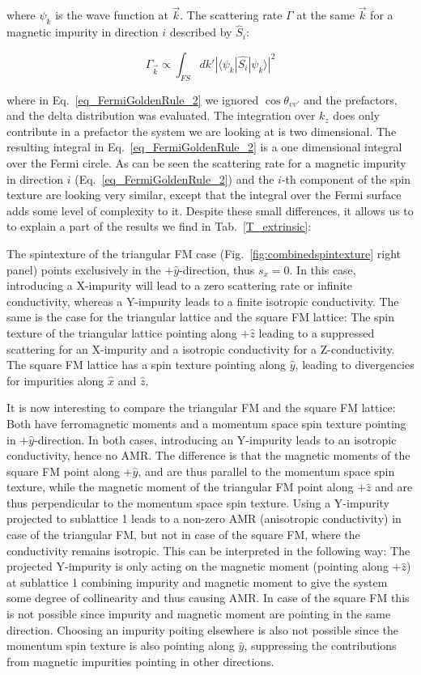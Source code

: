 \documentclass[prb,showpacs,amsmath,amssymb,superscriptaddress,twocolumn,floatfix]{revtex4-1}
\begin{document}
where $\psi_k$ is the wave function at $\vec{k}$. The scattering rate $\Gamma$ at the same $\vec{k}$ for a magnetic impurity in direction $i$ described by $\hat{S}_i$:

\begin{equation}	
{\Gamma_{\vec{k}}} \propto \int_{FS} dk' |\langle \psi_k |\hat{S_i}|\psi_k \rangle|^2
\label{eq_FermiGoldenRule_2}
\end{equation}

where in Eq.~\ref{eq_FermiGoldenRule_2} we ignored $\cos \theta_{vv'}$ and the prefactors, and the delta distribution was evaluated. The integration over $k_z$ does only contribute in a prefactor the system we are looking at is two dimensional. The resulting integral in Eq.~\ref{eq_FermiGoldenRule_2} is a one dimensional integral over the Fermi circle. As can be seen the scattering rate for a magnetic impurity in direction $i$ (Eq.~\ref{eq_FermiGoldenRule_2}) and the $i$-th component of the spin texture are looking very similar, except that the integral over the Fermi surface adds some level of complexity to it. Despite these small differences, it allows us to to explain a part of the results we find in Tab.~\ref{T_extrinsic}:

The spintexture of the triangular FM case (Fig.~\ref{fig:combinedspintexture} right panel) points exclusively in the $+\hat{y}$-direction, thus $s_x = 0$. In this case, introducing a X-impurity will lead to a zero scattering rate or infinite conductivity, whereas a Y-impurity leads to a finite isotropic conductivity. The same is the case for the triangular lattice and the square FM lattice: The spin texture of the triangular lattice pointing along $+\hat{z}$ leading to a suppressed scattering for an X-impurity and a isotropic conductivity for a Z-conductivity. The square FM lattice has a spin texture pointing along $\hat{y}$, leading to divergencies for impurities along $\hat{x}$ and $\hat{z}$.

It is now interesting to compare the triangular FM and the square FM lattice: Both have ferromagnetic moments and a momentum space spin texture pointing in $+\hat{y}$-direction. In both cases, introducing an Y-impurity leads to an isotropic conductivity, hence no AMR. The difference is that the magnetic moments of the square FM point along $+\hat{y}$, and are thus parallel to the momentum space spin texture, while the magnetic moment of the triangular FM point along $+\hat{z}$ and are thus perpendicular to the momentum space spin texture. Using a Y-impurity projected to sublattice 1 leads to a non-zero AMR (anisotropic conductivity) in case of the triangular FM, but not in case of the square FM, where the conductivity remains isotropic. This can be interpreted in the following way: The projected Y-impurity is only acting on the magnetic moment (pointing along $+\hat{z}$) at sublattice 1 combining impurity and magnetic moment to give the system some degree of collinearity and thus causing AMR. In case of the square FM this is not possible since impurity and magnetic moment are pointing in the same direction. Choosing an impurity poiting elsewhere is also not possible since the momentum spin texture is also pointing along $\hat{y}$, suppressing the contributions from magnetic impurities pointing in other directions.
\end{document}
